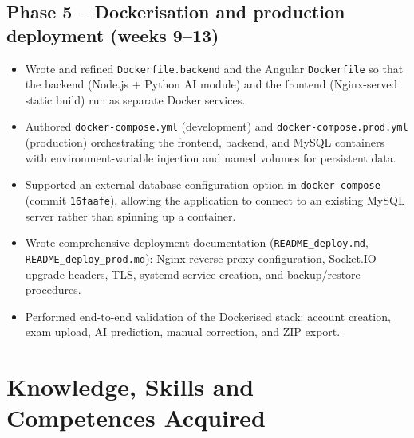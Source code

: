 \documentclass[a4paper,11pt]{article}
\begin{document}
\subsection*{Phase 5 -- Dockerisation and production deployment (weeks 9--13)}
\begin{itemize}[leftmargin=1.5em, itemsep=2pt]
  \item Wrote and refined \texttt{Dockerfile.backend} and the Angular \texttt{Dockerfile} so that
        the backend (Node.js + Python AI module) and the frontend (Nginx-served static build)
        run as separate Docker services.
  \item Authored \texttt{docker-compose.yml} (development) and \texttt{docker-compose.prod.yml}
        (production) orchestrating the frontend, backend, and MySQL containers with
        environment-variable injection and named volumes for persistent data.
  \item Supported an external database configuration option in \texttt{docker-compose}
        (commit \texttt{16faafe}), allowing the application to connect to an existing
        MySQL server rather than spinning up a container.
  \item \begin{sloppypar}Wrote comprehensive deployment documentation
        (\texttt{README\_deploy.md}, \texttt{README\_deploy\_prod.md}):
        Nginx reverse-proxy configuration, Socket.IO upgrade headers,
        TLS, systemd service creation, and backup/restore procedures.\end{sloppypar}
  \item Performed end-to-end validation of the Dockerised stack: account creation, exam upload,
        AI prediction, manual correction, and ZIP export.
\end{itemize}

\section{Knowledge, Skills and Competences Acquired}
\end{document}
